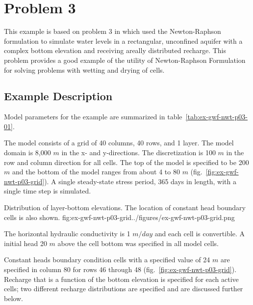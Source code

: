 \section{\mfn Problem 3}

This example is based on problem 3 in \cite{modflownwt} which used the Newton-Raphson formulation to simulate water levels in a rectangular, unconfined aquifer with a complex bottom elevation and receiving areally distributed recharge. This problem provides a good example of the utility of Newton-Raphson Formulation for solving problems with wetting and drying of cells.

\subsection{Example Description}

Model parameters for the example are summarized in table~\ref{tab:ex-gwf-nwt-p03-01}. 



The model consists of a grid of 40 columns, 40 rows, and 1 layer. The model domain is  8,000 $m$ in the x- and y-directions. The discretization is 100 $m$ in the row and column direction for all cells. The top of the model is specified to be 200 $m$ and the bottom of the model ranges from about 4 to 80 $m$ (fig.~\ref{fig:ex-gwf-nwt-p03-grid}). A single steady-state stress period, 365 days in length, with a single time step is simulated.

\begin{StandardFigure}{
                                     Distribution of layer-bottom elevations. The location of constant
                                     head boundary cells is also shown.
                                     }{fig:ex-gwf-nwt-p03-grid}{../figures/ex-gwf-nwt-p03-grid.png}
\end{StandardFigure}                                 

The horizontal hydraulic conductivity is 1 $m/day$ and each cell is convertible. A initial head 20 $m$ above the cell bottom was specified in all model cells.

Constant heads boundary condition cells with a specified value of 24 $m$ are specified in column 80 for rows 46 through 48 (fig.~\ref{fig:ex-gwf-nwt-p03-grid}). Recharge that is a function of the bottom elevation is specified for each active cells; two different recharge distributions are specified and are discussed further below.

